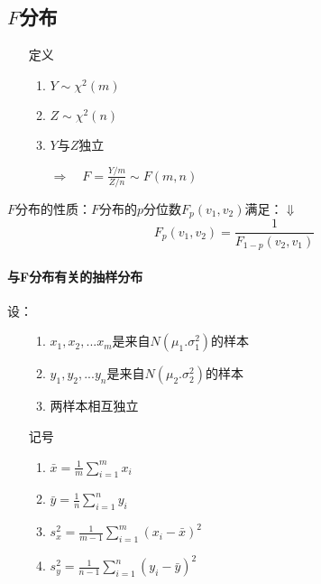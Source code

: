 \documentclass[UTF8,10pt]{book}
\begin{document}
        \subsection{$F$分布}
            \begin{itemize}
                \item [定义] {
                    \begin{enumerate}
                        \item $Y \sim \chi^2(m)$
                        \item $Z \sim \chi^2(n)$
                        \item $Y$与$Z$独立
                        
                        $\Rightarrow \quad F = \frac{Y/m}{Z/n} \sim F(m,n)$ 
                    \end{enumerate}
                }
            \end{itemize}
            
            $F$分布的性质：$F$分布的$p$分位数$F_p(v_1,v_2)$满足：$\Downarrow$
            $$ F_p(v_1,v_2) = \frac{1}{F_{1-p}(v_2,v_1)} $$
            
            \paragraph{与F分布有关的抽样分布} 设：
            \begin{itemize}
            	\item [] {
            		\begin{enumerate}
            			\item $x_1,x_2,...x_m$是来自$N(\mu_1.\sigma^2_1)$的样本
            			\item $y_1,y_2,...y_n$是来自$N(\mu_2.\sigma^2_2)$的样本
            			\item 两样本相互独立
            		\end{enumerate}
            	}
            \end{itemize}
        \begin{itemize}
        	\item [记号] {
        		\begin{enumerate}
        			\item $ \bar{x}=\frac{1}{m} \sum_{i=1}^{m} x_{i} $
        			\item $ \bar{y}=\frac{1}{n} \sum_{i=1}^{n} y_{i}$
        			\item $ s_{x}^{2}=\frac{1}{m-1} \sum_{i=1}^{m}\left(x_{i}-\bar{x}\right)^{2}$
        			\item $ s_{y}^{2}=\frac{1}{n-1} \sum_{i=1}^{n}\left(y_{i}-\bar{y}\right)^{2}$
        			
        		\end{enumerate}
        	}
        \end{itemize}
    	
\end{document}

